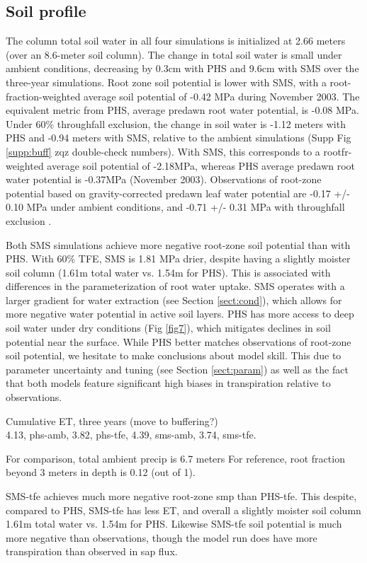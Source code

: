 \documentclass[draft,linenumbers]{agujournal}
\begin{document}
\subsection{Soil profile}
The column total soil water in all four simulations is initialized at 2.66 meters (over an 8.6-meter soil column).
The change in total soil water is small under ambient conditions, decreasing by 0.3cm with PHS and 9.6cm with SMS over the three-year simulations.
Root zone soil potential is lower with SMS, with a root-fraction-weighted average soil potential of -0.42 MPa during November 2003.
The equivalent metric from PHS, average predawn root water potential, is -0.08 MPa.
Under 60\% throughfall exclusion, the change in soil water is -1.12 meters with PHS and -0.94 meters with SMS, relative to the ambient simulations (Supp Fig \ref{supp:buff} zqz double-check numbers).
With SMS, this corresponds to a rootfr-weighted average soil potential of -2.18MPa, whereas 
PHS average predawn root water potential is -0.37MPa (November 2003).
Observations of root-zone potential based on gravity-corrected predawn leaf water potential are -0.17 +/- 0.10 MPa under ambient conditions, and -0.71 +/- 0.31 MPa with throughfall exclusion \citep{fisher2007}.

Both SMS simulations achieve more negative root-zone soil potential than with PHS.
With 60\% TFE, SMS is 1.81 MPa drier, despite having a slightly moister soil column (1.61m total water vs. 1.54m for PHS).
This is associated with differences in the parameterization of root water uptake.
SMS operates with a larger gradient for water extraction (see Section \ref{sect:cond}), which allows for more negative water potential in active soil layers.
PHS has more access to deep soil water under dry conditions (Fig \ref{fig7}), which mitigates declines in soil potential near the surface.
While PHS better matches observations of root-zone soil potential, we hesitate to make conclusions about model skill.
This due to parameter uncertainty and tuning (see Section \ref{sect:param}) as well as the fact that both models feature significant high biases in transpiration relative to observations.

Cumulative ET, three years (move to buffering?) \\
    4.13, phs-amb,
    3.82, phs-tfe,
    4.39, sms-amb,
    3.74, sms-tfe.

For comparison, total ambient precip is 6.7 meters
For reference, root fraction beyond 3 meters in depth is 0.12 (out of 1).


SMS-tfe achieves much more negative root-zone smp than PHS-tfe.
This despite, compared to PHS, SMS-tfe has less ET, and overall a slightly moister soil column 1.61m total water vs. 1.54m for PHS.
Likewise SMS-tfe soil potential is much more negative than observations, though the model run does have more transpiration than observed in sap flux.
\end{document}
